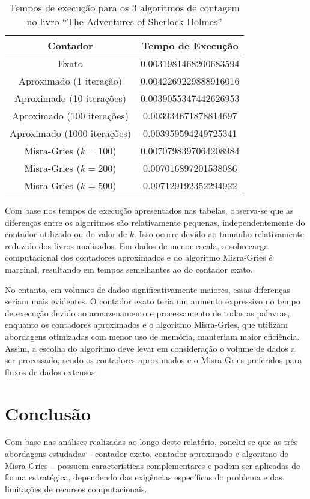 \documentclass[shortpaper, portugues, times, mirror]{revdetua}
\begin{document}
\begin{table}[H]
\centering
\begin{tabular}{|c|c|}
\hline
\textbf{Contador}& \textbf{Tempo de Execução}\\ \hline
Exato& 0.0031981468200683594 \\ \hline
Aproximado (1 iteração)& 0.0042269229888916016 \\ \hline
Aproximado (10 iterações)& 0.0039055347442626953 \\ \hline
Aproximado (100 iterações)& 0.003934671878814697 \\ \hline
Aproximado (1000 iterações)& 0.003959594249725341 \\ \hline
Misra-Gries (\(k = 100\))& 0.0070798397064208984 \\ \hline
Misra-Gries (\(k = 200\))& 0.007016897201538086 \\ \hline
Misra-Gries (\(k = 500\))& 0.007129192352294922 \\ \hline
\end{tabular}
\caption{Tempos de execução para os 3 algoritmos de contagem no livro “The Adventures of Sherlock Holmes”}
\label{tab:accuracy}
\end{table}

Com base nos tempos de execução apresentados nas tabelas, observa-se que as diferenças entre os algoritmos são relativamente pequenas, independentemente do contador utilizado ou do valor de \(k\). Isso ocorre devido ao tamanho relativamente reduzido dos livros analisados. Em dados de menor escala, a sobrecarga computacional dos contadores aproximados e do algoritmo Misra-Gries é marginal, resultando em tempos semelhantes ao do contador exato.

No entanto, em volumes de dados significativamente maiores, essas diferenças seriam mais evidentes. O contador exato teria um aumento expressivo no tempo de execução devido ao armazenamento e processamento de todas as palavras, enquanto os contadores aproximados e o algoritmo Misra-Gries, que utilizam abordagens otimizadas com menor uso de memória, manteriam maior eficiência. Assim, a escolha do algoritmo deve levar em consideração o volume de dados a ser processado, sendo os contadores aproximados e o Misra-Gries preferidos para fluxos de dados extensos.

\section{Conclusão}

Com base nas análises realizadas ao longo deste relatório, conclui-se que as três abordagens estudadas – contador exato, contador aproximado e algoritmo de Misra-Gries – possuem características complementares e podem ser aplicadas de forma estratégica, dependendo das exigências específicas do problema e das limitações de recursos computacionais.
\end{document}
